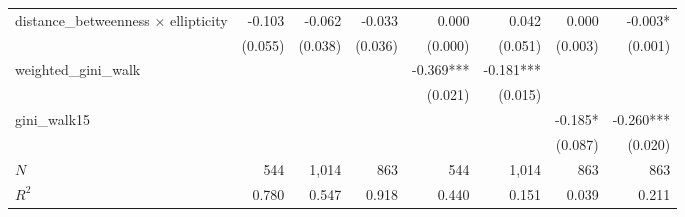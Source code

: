 \begin{tabular}{lrrrrrrr}
distance\_betweenness $\times$ ellipticity &                       -0.103 &                     -0.062 &                       -0.033 &                            0.000 &                          0.042 &                                                             0.000 &                                             -0.003* \\ 
                                           &                      (0.055) &                    (0.038) &                      (0.036) &                          (0.000) &                        (0.051) &                                                           (0.003) &                                             (0.001) \\ 
weighted\_gini\_walk                       &                              &                            &                              &                        -0.369*** &                      -0.181*** &                                                                   &                                                     \\ 
                                           &                              &                            &                              &                          (0.021) &                        (0.015) &                                                                   &                                                     \\ 
gini\_walk15                               &                              &                            &                              &                                  &                                &                                                           -0.185* &                                           -0.260*** \\ 
                                           &                              &                            &                              &                                  &                                &                                                           (0.087) &                                             (0.020) \\ 
\midrule
$N$                                        &                          544 &                      1,014 &                          863 &                              544 &                          1,014 &                                                               863 &                                                 863 \\ 
$R^2$                                      &                        0.780 &                      0.547 &                        0.918 &                            0.440 &                          0.151 &                                                             0.039 &                                               0.211 \\ 
\bottomrule
\end{tabular}
